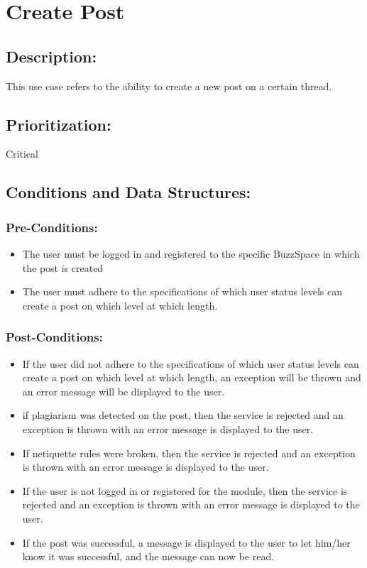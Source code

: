 \documentclass[a4paper,11pt]{article}
\begin{document}
\section{Create Post}
\subsection*{Description:}This use case refers to the ability to create a new post on a certain thread. 
\subsection{Prioritization:} Critical
\subsection{Conditions and Data Structures:}
\subsubsection*{Pre-Conditions:}
\begin{itemize}
	\item The user must be logged in and registered to the specific BuzzSpace in which the post is created
	\item The user must adhere to the specifications of which user status levels can create a post on which level at which length.
\end{itemize}
\subsubsection*{Post-Conditions:}
\begin{itemize}
	\item If the user did not adhere to the specifications of which user status levels can create a post on which level at which length, an exception will be thrown and an error
	message will be displayed to the user.
	\item if plagiarism was detected on the post, then the service is rejected and an exception is thrown with an error message is displayed to the user.
	\item If netiquette rules were broken,  then the service is rejected and an exception is thrown with an error message is displayed to the user.
	\item If the user is not logged in or registered for the module, then the service is rejected and an exception is thrown with an error message is displayed to the user.
	\item If the post was successful, a message is displayed to the user to let him/her know it was successful, and the message can now be read.
\end{itemize}
\end{document}
